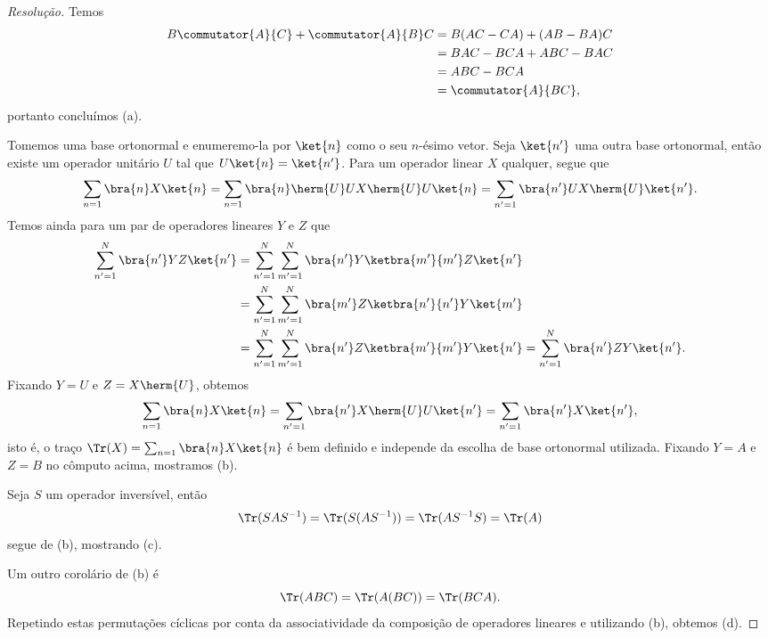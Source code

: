 \begin{proof}[Resolução]
    Temos
    \begin{align*}
        B \commutator{A}{C} + \commutator{A}{B}C &= B(AC - CA) + (AB - BA)C\\
                                                 &= BAC - BCA + ABC - BAC\\
                                                 &= ABC - BCA\\
                                                 &= \commutator{A}{BC},
    \end{align*}
    portanto concluímos (a).

    Tomemos uma base ortonormal e enumeremo-la por \(\ket{n}\) como o seu \(n\)-ésimo vetor. Seja \(\ket{n'}\) uma outra base ortonormal, então existe um operador unitário \(U\) tal que \(U\ket{n} = \ket{n'}\). Para um operador linear \(X\) qualquer, segue que
    \begin{equation*}
        \sum_{n = 1} \bra{n} X \ket{n} = \sum_{n = 1} \bra{n} \herm{U}U X \herm{U}U \ket{n} = \sum_{n' = 1} \bra{n'} U X \herm{U} \ket{n'}.
    \end{equation*}
    Temos ainda para um par de operadores lineares \(Y\) e \(Z\) que
    \begin{align*}
        \sum_{n' = 1}^{N} \bra{n'} YZ \ket{n'} &= \sum_{n'=1}^{N} \sum_{m' = 1}^{N} \bra{n'} Y \ketbra{m'}{m'}Z\ket{n'}\\
                                            &= \sum_{n'=1}^{N}\sum_{m'=1}^{N} \bra{m'} Z \ketbra{n'}{n'} Y\ket{m'}\\
                                            &= \sum_{n'=1}^{N}\sum_{m'=1}^{N} \bra{n'} Z \ketbra{m'}{m'} Y\ket{n'} = \sum_{n'=1}^{N} \bra{n'} ZY \ket{n'}.
    \end{align*}
    Fixando \(Y = U\) e \(Z = X\herm{U}\), obtemos
    \begin{equation*}
        \sum_{n=1} \bra{n} X \ket{n} = \sum_{n' = 1} \bra{n'} X\herm{U} U \ket{n'} = \sum_{n' = 1} \bra{n'} X \ket{n'},
    \end{equation*}
    isto é, o traço \(\Tr(X) = \sum_{n=1} \bra{n} X \ket{n}\) é bem definido e independe da escolha de base ortonormal utilizada. Fixando \(Y = A\) e \(Z = B\) no cômputo acima, mostramos (b).

    Seja \(S\) um operador inversível, então
    \begin{equation*}
        \Tr(SAS^{-1}) = \Tr(S(AS^{-1})) = \Tr(AS^{-1}S) = \Tr(A)
    \end{equation*}
    segue de (b), mostrando (c).

    Um outro corolário de (b) é
    \begin{equation*}
        \Tr(ABC) = \Tr(A(BC)) = \Tr(BCA).
    \end{equation*}
    Repetindo estas permutações cíclicas por conta da associatividade da composição de operadores lineares e utilizando (b), obtemos (d).
\end{proof}
